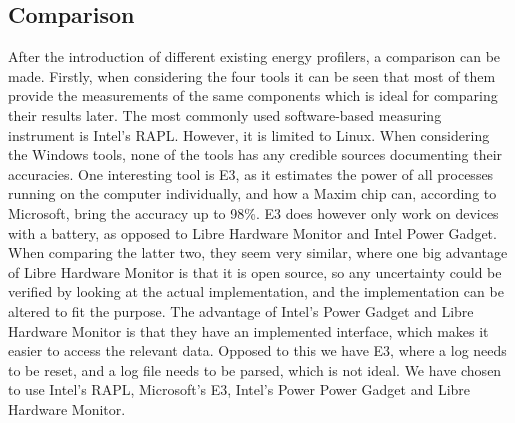 \subsection{Comparison}\label{subsec:software_comparison}

After the introduction of different existing energy profilers, a comparison can be made. Firstly, when considering the four tools it can be seen that most of them provide the measurements of the same components which is ideal for comparing their results later. The most commonly used software-based measuring instrument is Intel's RAPL. However, it is limited to Linux. When considering the Windows tools, none of the tools has any credible sources documenting their accuracies. One interesting tool is E3, as it estimates the power of all processes running on the computer individually, and how a Maxim chip can, according to Microsoft, bring the accuracy up to 98\%.\cite[]{E3WinHec} E3 does however only work on devices with a battery, as opposed to Libre Hardware Monitor and Intel Power Gadget. When comparing the latter two, they seem very similar, where one big advantage of Libre Hardware Monitor is that it is open source, so any uncertainty could be verified by looking at the actual implementation, and the implementation can be altered to fit the purpose. The advantage of Intel's Power Gadget and Libre Hardware Monitor is that they have an implemented interface, which makes it easier to access the relevant data. Opposed to this we have E3, where a log needs to be reset, and a log file needs to be parsed, which is not ideal. We have chosen to use Intel's RAPL, Microsoft's E3, Intel's Power Power Gadget and Libre Hardware Monitor. 


